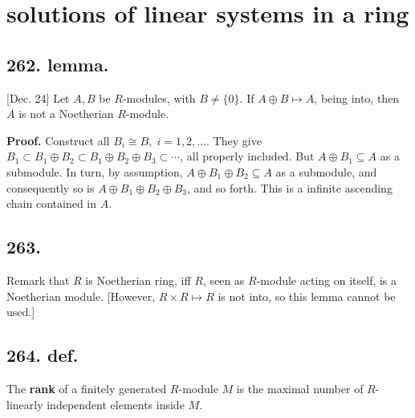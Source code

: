 \documentclass[12pt]{article}
\newcommand{\X}\times%
\newcommand{\Mp}\mapsto%
\newcommand{\Ss}[1]{\textsf{\bfseries{#1}}}%
\begin{document}
\section{solutions of linear systems in a ring}
\subsection*{262. lemma.} [Dec. 24] Let \(A,B\) be \(R\)-modules, with \(B \neq \{0\}\). 
If \(A \oplus B \Mp A\), being into, then \(A\) is not a Noetherian \(R\)-module. \par
\Ss{Proof.} Construct all \(B_i \cong B,\; i=1,2,\dotsc\). 
They give \(B_1 \subset B_1 \oplus B_2 \subset B_1 \oplus B_2 \oplus B_3 \subset\dotsb\), all properly included. 
But \(A \oplus B_1 \subseteq A\) as a submodule. 
In turn, by assumption, \(A \oplus B_1 \oplus B_2 \subseteq A\) as a submodule, and consequently so is \(A \oplus B_1 \oplus B_2 \oplus B_3\), and so forth. 
This is a infinite ascending chain contained in \(A\).

\subsection*{263.} Remark that \(R\) is Noetherian ring, iff \(R\), seen as \(R\)-module acting on itself, is a Noetherian module. 
[However, \(R \X R \Mp R\) is not into, so this lemma cannot be used.]

\subsection*{264. def.} The \Ss{rank} of a finitely generated \(R\)-module \(M\) is the maximal number of \(R\)-linearly independent elements inside \(M\). 
\end{document}
